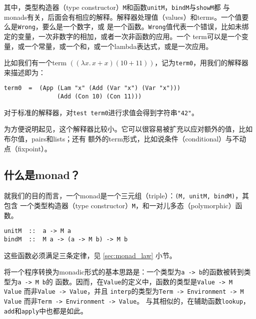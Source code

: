 \documentclass[12pt]{article}
\begin{document}
\noindent{}其中，类型构造器（type constructor）\texttt{M}和函数\texttt{unitM}，\texttt{bindM}与\texttt{showM}都
与monads有关，后面会有相应的解释。解释器处理值（values）和terms。一个值要么是\texttt{Wrong}，要么是一个数字，或
是一个函数。\texttt{Wrong}值代表一个错误，比如未绑定的变量，一次非数字的相加，或者一次非函数的应用。一个
term可以是一个变量，或一个常量，或一个和，或一个lambda表达式，或是一次应用。

\indent{}比如我们有一个term $((\lambda x.\,x + x) (10 + 11))$，记为\texttt{term0}，用我们的解释器来描述即为：
\begin{verbatim}
term0  =  (App (Lam "x" (Add (Var "x") (Var "x")))
               (Add (Con 10) (Con 11)))
\end{verbatim}
\noindent{}对于标准的解释器，对\texttt{test term0}进行求值会得到字符串\texttt{"42"}。

\indent{}为方便说明起见，这个解释器比较小。它可以很容易被扩充以应对额外的值，比如布尔值，pairs和lists；还有
额外的term形式，比如说条件（conditional）与不动点（fixpoint）。

\subsection{什么是monad？}\label{sec:what_is_monad}
\indent{}就我们的目的而言，一个monad是一个三元组（triple）：\texttt{(M, unitM, bindM)}，其包含
一个类型构造器（type constructor）\texttt{M}，和一对儿多态（polymorphic）函数。
\begin{verbatim}
unitM  ::  a -> M a
bindM  ::  M a -> (a -> M b) -> M b
\end{verbatim}
\noindent{}这些函数必须满足三条定律，见 \ref{sec:monad_law} 小节。

\indent{}将一个程序转换为monadic形式的基本思路是：一个类型为\texttt{a -> b}的函数被转到类型为\texttt{a -> M b}的
函数。因而，在\texttt{Value}的定义中，函数的类型是\texttt{Value -> M Value} 而非\texttt{Value -> Value}，并且
\texttt{interp}的类型为\texttt{Term -> Environment -> M Value} 而非\texttt{Term -> Environment -> Value}。
与其相似的，在辅助函数\texttt{lookup}，\texttt{add}和\texttt{apply}中也都是如此。
\end{document}
